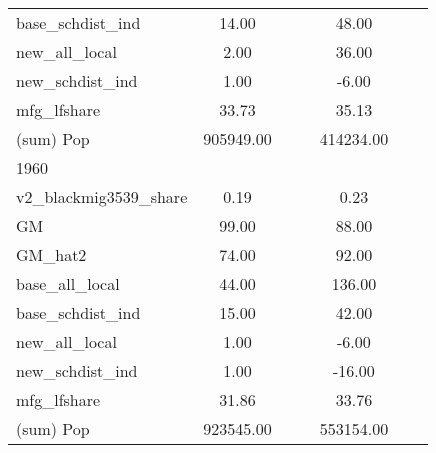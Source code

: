 \begin{table}[htbp]
\begin{tabular}{l*{2}{ccc}}
base\_schdist\_ind    &       14.00&            &            &       48.00&            &            \\
new\_all\_local       &        2.00&            &            &       36.00&            &            \\
new\_schdist\_ind     &        1.00&            &            &       -6.00&            &            \\
mfg\_lfshare         &       33.73&            &            &       35.13&            &            \\
(sum) Pop           &   905949.00&            &            &   414234.00&            &            \\
\midrule
1960                &            &            &            &            &            &            \\
v2\_blackmig3539\_share&        0.19&            &            &        0.23&            &            \\
GM                  &       99.00&            &            &       88.00&            &            \\
GM\_hat2             &       74.00&            &            &       92.00&            &            \\
base\_all\_local      &       44.00&            &            &      136.00&            &            \\
base\_schdist\_ind    &       15.00&            &            &       42.00&            &            \\
new\_all\_local       &        1.00&            &            &       -6.00&            &            \\
new\_schdist\_ind     &        1.00&            &            &      -16.00&            &            \\
mfg\_lfshare         &       31.86&            &            &       33.76&            &            \\
(sum) Pop           &   923545.00&            &            &   553154.00&            &            \\
\bottomrule
\end{tabular}
\end{table}
